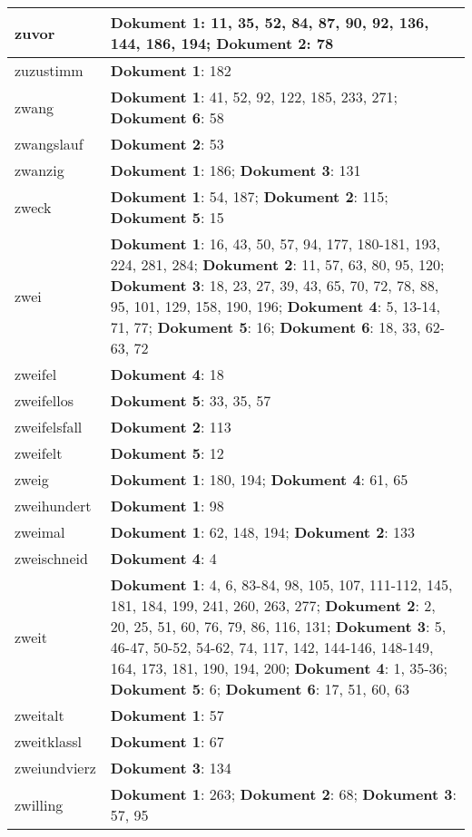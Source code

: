 \documentclass[a5paper]{article}
\begin{document}
\begin{longtable}[l]{|l|p{3in}|}
\hline
zuvor & \textbf{Dokument 1}: 11, 35, 52, 84, 87, 90, 92, 136, 144, 186, 194; \textbf{Dokument 2}: 78 \\
\hline
zuzustimm & \textbf{Dokument 1}: 182 \\
\hline
zwang & \textbf{Dokument 1}: 41, 52, 92, 122, 185, 233, 271; \textbf{Dokument 6}: 58 \\
\hline
zwangslauf & \textbf{Dokument 2}: 53 \\
\hline
zwanzig & \textbf{Dokument 1}: 186; \textbf{Dokument 3}: 131 \\
\hline
zweck & \textbf{Dokument 1}: 54, 187; \textbf{Dokument 2}: 115; \textbf{Dokument 5}: 15 \\
\hline
zwei & \textbf{Dokument 1}: 16, 43, 50, 57, 94, 177, 180-181, 193, 224, 281, 284; \textbf{Dokument 2}: 11, 57, 63, 80, 95, 120; \textbf{Dokument 3}: 18, 23, 27, 39, 43, 65, 70, 72, 78, 88, 95, 101, 129, 158, 190, 196; \textbf{Dokument 4}: 5, 13-14, 71, 77; \textbf{Dokument 5}: 16; \textbf{Dokument 6}: 18, 33, 62-63, 72 \\
\hline
zweifel & \textbf{Dokument 4}: 18 \\
\hline
zweifellos & \textbf{Dokument 5}: 33, 35, 57 \\
\hline
zweifelsfall & \textbf{Dokument 2}: 113 \\
\hline
zweifelt & \textbf{Dokument 5}: 12 \\
\hline
zweig & \textbf{Dokument 1}: 180, 194; \textbf{Dokument 4}: 61, 65 \\
\hline
zweihundert & \textbf{Dokument 1}: 98 \\
\hline
zweimal & \textbf{Dokument 1}: 62, 148, 194; \textbf{Dokument 2}: 133 \\
\hline
zweischneid & \textbf{Dokument 4}: 4 \\
\hline
zweit & \textbf{Dokument 1}: 4, 6, 83-84, 98, 105, 107, 111-112, 145, 181, 184, 199, 241, 260, 263, 277; \textbf{Dokument 2}: 2, 20, 25, 51, 60, 76, 79, 86, 116, 131; \textbf{Dokument 3}: 5, 46-47, 50-52, 54-62, 74, 117, 142, 144-146, 148-149, 164, 173, 181, 190, 194, 200; \textbf{Dokument 4}: 1, 35-36; \textbf{Dokument 5}: 6; \textbf{Dokument 6}: 17, 51, 60, 63 \\
\hline
zweitalt & \textbf{Dokument 1}: 57 \\
\hline
zweitklassl & \textbf{Dokument 1}: 67 \\
\hline
zweiundvierz & \textbf{Dokument 3}: 134 \\
\hline
zwilling & \textbf{Dokument 1}: 263; \textbf{Dokument 2}: 68; \textbf{Dokument 3}: 57, 95 \\

\end{longtable}
\end{document}
